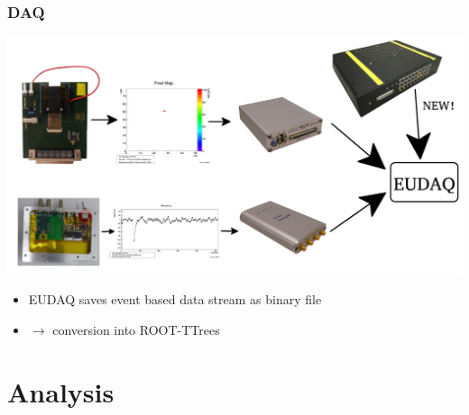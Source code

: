 \documentclass[9pt]{beamer}
\begin{document}
\begin{frame}
	\frametitle{DAQ}
	\begin{center}
		\includegraphics[width=.9\textwidth]{Intro}
	\end{center}
	\begin{itemize}
		\item EUDAQ saves event based data stream as binary file
		\item $\rightarrow$ conversion into ROOT-TTrees
	\end{itemize}
\end{frame}
\section{Analysis}
\end{document}
